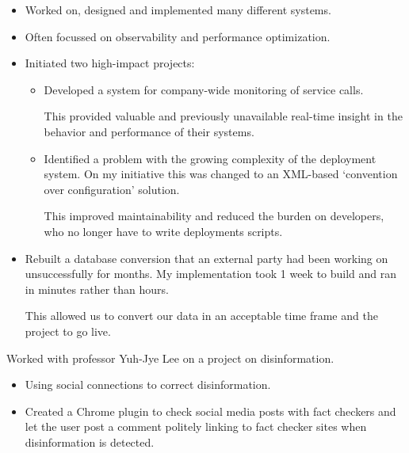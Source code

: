 \documentclass[10pt,a4paper]{../altacv}
\begin{document}
	\begin{itemize}
		\item Worked on, designed and implemented many different systems.
		\smallskip
		\item Often focussed on observability and performance optimization.
		\smallskip
		\item Initiated two high-impact projects:
		\begin{itemize}
			\item[-] Developed a system for company-wide monitoring of service calls.
			
			This provided valuable and previously unavailable real-time insight in the behavior and performance of their systems.
			\smallskip
			\item[-] Identified a problem with the growing complexity of the deployment system. On my initiative this was changed to an XML-based ‘convention over configuration' solution.
			
			This improved maintainability and reduced the burden on developers, who no longer have to write deployments scripts.
		\end{itemize}
		\smallskip
		\item Rebuilt a database conversion that an external party had been working on unsuccessfully for months. My implementation took 1 week to build and ran in minutes rather than hours.
		
		This allowed us to convert our data in an acceptable time frame and the project to go live.
	\end{itemize}
	
	\medskip
	
	
	
	
	\newpage
	{\marginpar{\vspace*{\dimexpr1pt-\baselineskip}\raggedright}}
	
	
	Worked with professor Yuh-Jye Lee on a project on disinformation.
	
	\medskip
	
	\begin{itemize}
		\item Using social connections to correct disinformation.
		\smallskip
		\item Created a Chrome plugin to check social media posts with fact checkers and let the user post a comment politely linking to fact checker sites when disinformation is detected.
	\end{itemize}
	
\end{document}
